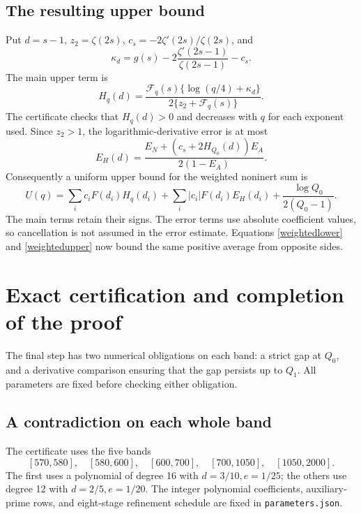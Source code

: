 \documentclass[11pt]{article}
\begin{document}
\subsection{The resulting upper bound}
Put \(d=s-1\), \(z_2=\zeta(2s)\),
\(c_s=-2\zeta'(2s)/\zeta(2s)\), and
\[
 \kappa_d=g(s)-2\frac{\zeta'(2s-1)}{\zeta(2s-1)}-c_s.
\]
The main upper term is
\begin{equation}\label{Hmain}
 H_q(d)=\frac{\mathcal F_q(s)\{\log(q/4)+\kappa_d\}}
                   {2\{z_2+\mathcal F_q(s)\}}.
\end{equation}
The certificate checks that \(H_q(d)>0\) and decreases with \(q\)
for each exponent used. Since \(z_2>1\), the logarithmic-derivative
error is at most
\begin{equation}\label{Herror}
 E_H(d)=\frac{E_N+(c_s+2H_{Q_0}(d))E_A}{2(1-E_A)}.
\end{equation}
Consequently a uniform upper bound for the weighted noninert sum is
\begin{equation}\label{weightedupper}
 U(q)=\sum_i c_iF(d_i)H_q(d_i)
       +\sum_i|c_i|F(d_i)E_H(d_i)
       +\frac{\log Q_0}{2(Q_0-1)}.
\end{equation}
The main terms retain their signs. The error terms use absolute
coefficient values, so cancellation is not assumed in the error
estimate. Equations \eqref{weightedlower} and \eqref{weightedupper}
now bound the same positive average from opposite sides.

\section{Exact certification and completion of the proof}\label{certificate}
The final step has two numerical obligations on each band: a strict
gap at \(Q_0\), and a derivative comparison ensuring that the gap
persists up to \(Q_1\). All parameters are fixed before checking
either obligation.

\subsection{A contradiction on each whole band}
The certificate uses the five bands
\[
 [570,580],\quad[580,600],\quad[600,700],\quad[700,1050],\quad[1050,2000].
\]
The first uses a polynomial of degree 16 with \(d=3/10,e=1/25\);
the others use degree 12 with \(d=2/5,e=1/20\). The integer
polynomial coefficients, auxiliary-prime rows, and eight-stage
refinement schedule are fixed in \texttt{parameters.json}.
\end{document}
